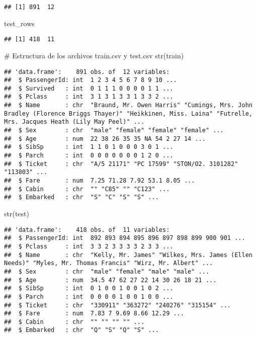 \documentclass[
]{article}
\newenvironment{Shaded}{\begin{snugshade}}{\end{snugshade}}
\newcommand{\CommentTok}[1]{\textcolor[rgb]{0.50,0.62,0.50}{#1}}
\newcommand{\KeywordTok}[1]{\textcolor[rgb]{0.94,0.87,0.69}{#1}}
\newcommand{\NormalTok}[1]{\textcolor[rgb]{0.80,0.80,0.80}{#1}}
\begin{document}
\begin{verbatim}
## [1] 891  12
\end{verbatim}

\begin{Shaded}
\begin{Highlighting}[]
\NormalTok{test_rows}
\end{Highlighting}
\end{Shaded}

\begin{verbatim}
## [1] 418  11
\end{verbatim}

\begin{Shaded}
\begin{Highlighting}[]
\CommentTok{# Estructura de los archivos train.csv y test.csv}
\KeywordTok{str}\NormalTok{(train)}
\end{Highlighting}
\end{Shaded}

\begin{verbatim}
## 'data.frame':    891 obs. of  12 variables:
##  $ PassengerId: int  1 2 3 4 5 6 7 8 9 10 ...
##  $ Survived   : int  0 1 1 1 0 0 0 0 1 1 ...
##  $ Pclass     : int  3 1 3 1 3 3 1 3 3 2 ...
##  $ Name       : chr  "Braund, Mr. Owen Harris" "Cumings, Mrs. John Bradley (Florence Briggs Thayer)" "Heikkinen, Miss. Laina" "Futrelle, Mrs. Jacques Heath (Lily May Peel)" ...
##  $ Sex        : chr  "male" "female" "female" "female" ...
##  $ Age        : num  22 38 26 35 35 NA 54 2 27 14 ...
##  $ SibSp      : int  1 1 0 1 0 0 0 3 0 1 ...
##  $ Parch      : int  0 0 0 0 0 0 0 1 2 0 ...
##  $ Ticket     : chr  "A/5 21171" "PC 17599" "STON/O2. 3101282" "113803" ...
##  $ Fare       : num  7.25 71.28 7.92 53.1 8.05 ...
##  $ Cabin      : chr  "" "C85" "" "C123" ...
##  $ Embarked   : chr  "S" "C" "S" "S" ...
\end{verbatim}

\begin{Shaded}
\begin{Highlighting}[]
\KeywordTok{str}\NormalTok{(test)}
\end{Highlighting}
\end{Shaded}

\begin{verbatim}
## 'data.frame':    418 obs. of  11 variables:
##  $ PassengerId: int  892 893 894 895 896 897 898 899 900 901 ...
##  $ Pclass     : int  3 3 2 3 3 3 3 2 3 3 ...
##  $ Name       : chr  "Kelly, Mr. James" "Wilkes, Mrs. James (Ellen Needs)" "Myles, Mr. Thomas Francis" "Wirz, Mr. Albert" ...
##  $ Sex        : chr  "male" "female" "male" "male" ...
##  $ Age        : num  34.5 47 62 27 22 14 30 26 18 21 ...
##  $ SibSp      : int  0 1 0 0 1 0 0 1 0 2 ...
##  $ Parch      : int  0 0 0 0 1 0 0 1 0 0 ...
##  $ Ticket     : chr  "330911" "363272" "240276" "315154" ...
##  $ Fare       : num  7.83 7 9.69 8.66 12.29 ...
##  $ Cabin      : chr  "" "" "" "" ...
##  $ Embarked   : chr  "Q" "S" "Q" "S" ...
\end{verbatim}
\end{document}
